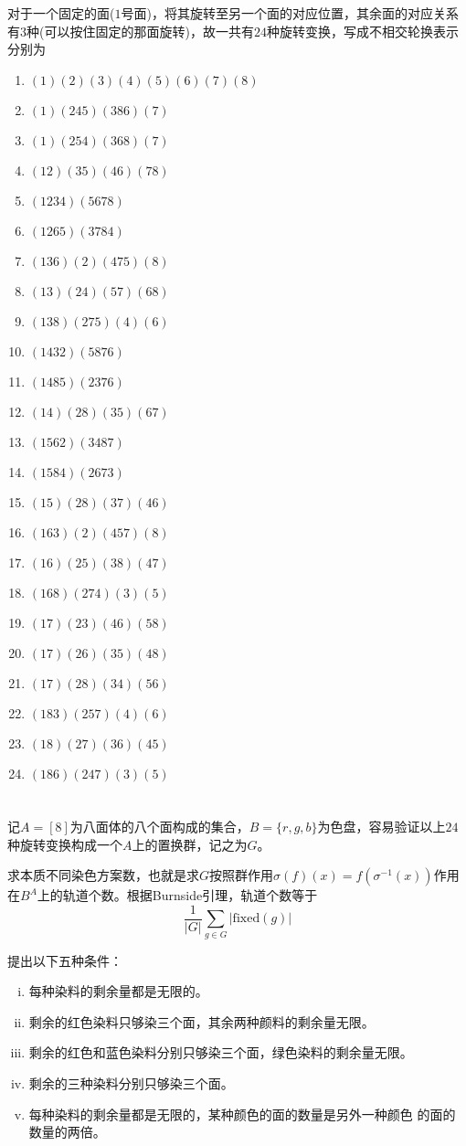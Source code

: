 \documentclass[8pt]{article}
\begin{document}
对于一个固定的面($1$号面)，将其旋转至另一个面的对应位置，其余面的对应关系有$3$种(可以按住固定的那面旋转)，故一共有$24$种旋转变换，写成不相交轮换表示分别为
\begin{enumerate}
\item $(1)(2)(3)(4)(5)(6)(7)(8)$
\item $(1)(245)(386)(7)$
\item $(1)(254)(368)(7)$
\item $(12)(35)(46)(78)$
\item $(1234)(5678)$
\item $(1265)(3784)$
\item $(136)(2)(475)(8)$
\item $(13)(24)(57)(68)$
\item $(138)(275)(4)(6)$
\item $(1432)(5876)$
\item $(1485)(2376)$
\item $(14)(28)(35)(67)$
\item $(1562)(3487)$
\item $(1584)(2673)$
\item $(15)(28)(37)(46)$
\item $(163)(2)(457)(8)$
\item $(16)(25)(38)(47)$
\item $(168)(274)(3)(5)$
\item $(17)(23)(46)(58)$
\item $(17)(26)(35)(48)$
\item $(17)(28)(34)(56)$
\item $(183)(257)(4)(6)$
\item $(18)(27)(36)(45)$
\item $(186)(247)(3)(5)$\end{enumerate}

\section{}

记$A = [8]$为八面体的八个面构成的集合，$B = \{r, g, b\}$为色盘，容易验证以上$24$种旋转变换构成一个$A$上的置换群，记之为$G$。

求本质不同染色方案数，也就是求$G$按照群作用$\sigma(f)(x) = f(\sigma^{-1}(x))$作用在$B^A$上的轨道个数。根据Burnside引理，轨道个数等于
\begin{equation}
\frac{1}{|G|}\sum_{g \in G}|\text{fixed}(g)|
\end{equation}

提出以下五种条件：
\begin{enumerate}[i.]
	\item 每种染料的剩余量都是无限的。
	\item 剩余的红色染料只够染三个面，其余两种颜料的剩余量无限。
	\item 剩余的红色和蓝色染料分别只够染三个面，绿色染料的剩余量无限。
	\item 剩余的三种染料分别只够染三个面。
	\item 每种染料的剩余量都是无限的，某种颜色的面的数量是另外一种颜色
	的面的数量的两倍。
\end{enumerate}
\end{document}
